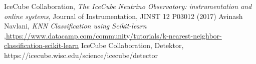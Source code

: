 \begin{thebibliography}{99}
 IceCube Collaboration, \textit{The IceCube Neutrino Observatory: instrumentation and online systems}, Journal of Instrumentation, JINST 12 P03012 (2017)
 Avinash Navlani, \textit{KNN Classification using Scikit-learn} ,\url{https://www.datacamp.com/community/tutorials/k-nearest-neighbor-classification-scikit-learn}
 IceCube Collaboration, Detektor, https://icecube.wisc.edu/science/icecube/detector
\end{thebibliography}
